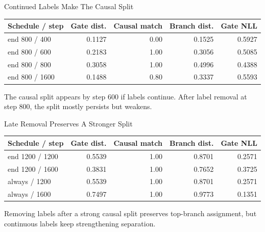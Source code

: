 \documentclass[aspectratio=169]{beamer}
\begin{document}
\begin{frame}{Continued Labels Make The Causal Split}
  \small
  \begin{center}
  \begin{tabular}{lrrrr}
    \toprule
    Schedule / step & Gate dist. & Causal match & Branch dist. & Gate NLL \\
    \midrule
    end 800 / 400 & 0.1127 & 0.00 & 0.1525 & 0.5927 \\
    end 800 / 600 & 0.2183 & 1.00 & 0.3056 & 0.5085 \\
    end 800 / 800 & 0.3058 & 1.00 & 0.4996 & 0.4388 \\
    end 800 / 1600 & 0.1488 & 0.80 & 0.3337 & 0.5593 \\
    \bottomrule
  \end{tabular}
  \end{center}

  \vspace{0.8em}
  The causal split appears by step 600 if labels continue. After label removal
  at step 800, the split mostly persists but weakens.
\end{frame}

\begin{frame}{Late Removal Preserves A Stronger Split}
  \small
  \begin{center}
  \begin{tabular}{lrrrr}
    \toprule
    Schedule / step & Gate dist. & Causal match & Branch dist. & Gate NLL \\
    \midrule
    end 1200 / 1200 & 0.5539 & 1.00 & 0.8701 & 0.2571 \\
    end 1200 / 1600 & 0.3831 & 1.00 & 0.7652 & 0.3725 \\
    always / 1200 & 0.5539 & 1.00 & 0.8701 & 0.2571 \\
    always / 1600 & 0.7497 & 1.00 & 0.9773 & 0.1351 \\
    \bottomrule
  \end{tabular}
  \end{center}

  \vspace{0.8em}
  Removing labels after a strong causal split preserves top-branch assignment,
  but continuous labels keep strengthening separation.
\end{frame}
\end{document}
